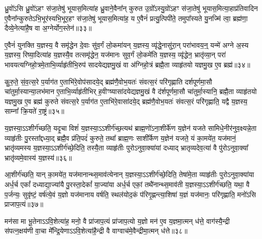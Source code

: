 {\anuvakamend[{उ॒क्थ्ये॑नोपा॒प्नोत्य॑गच्छतां॒ यः पु॑रो॒डाशं॑ च चत्वारि॒ꣳ॒शच्च॑॥९॥}]}

ध्रु॒वो॑\-ऽसि ध्रु॒वो॑\-ऽहꣳ स॑जा॒तेषु॑ भूयास॒मित्या॑ह ध्रु॒वाने॒वैना᳚न् कुरुत उ॒ग्रो᳚\-ऽस्यु॒ग्रो॑\-ऽहꣳ स॑जा॒तेषु॑ भूयास॒मित्या॒हाप्र॑तिवादिन ए॒वैना᳚न्कुरुते\-ऽभि॒भूर॑स्यभि॒भूर॒हꣳ स॑जा॒तेषु॑ भूयास॒मित्या॑ह॒ य ए॒वैनं॑ प्रत्यु॒त्पिपी॑ते॒ तमुपा᳚स्यते यु॒नज्मि॑ त्वा॒ ब्रह्म॑णा॒ दैव्ये॒नेत्या॑है॒ष वा अ॒ग्नेर्योग॒स्तेन॑॥३३॥

ए॒वैनं॑ युनक्ति य॒ज्ञस्य॒ वै समृ॑द्धेन दे॒वाः सु॑व॒र्गं लो॒कमा॑यन् य॒ज्ञस्य॒ व्यृ॑द्धे॒नासु॑रा॒न् परा॑भावय॒न्॒ यन्मे॑ अग्ने अ॒स्य य॒ज्ञस्य॒ रिष्या॒दित्या॑ह य॒ज्ञस्यै॒व तत्समृ॑द्धेन॒ यज॑मानः सुव॒र्गं लो॒कमे॑ति य॒ज्ञस्य॒ व्यृ॑द्धेन॒ भ्रातृ॑व्या॒न् परा॑ भावयत्यग्निहो॒त्रमे॒ताभि॒र्व्याहृ॑तीभि॒रुप॑ सादयेद्यज्ञमु॒खं वा अ॑ग्निहो॒त्रं ब्रह्मै॒ता व्याहृ॑तयो यज्ञमु॒ख ए॒व ब्रह्म॑॥३४॥

कु॒रु॒ते॒ सं॒व॒त्स॒रे प॒र्याग॑त ए॒ताभि॑रे॒वोप॑सादये॒द् ब्रह्म॑णै॒वोभ॒यतः॑ संवत्स॒रं परि॑गृह्णाति दर्\mbox{}शपूर्णमा॒सौ चा॑तुर्मा॒स्यान्या॒लभ॑मान ए॒ताभि॒र्व्याहृ॑तीभिर्\mbox{} ह॒वीꣳष्यासा॑दयेद्यज्ञमु॒खं वै द॑र्\mbox{}शपूर्णमा॒सौ चा॑तुर्मा॒स्यानि॒ ब्रह्मै॒ता व्याहृ॑तयो यज्ञमु॒ख ए॒व ब्रह्म॑ कुरुते संवत्स॒रे प॒र्याग॑त ए॒ताभि॑रे॒वासा॑दये॒द् ब्रह्म॑णै॒वोभ॒यतः॑ संवत्स॒रं परि॑गृह्णाति॒ यद्वै य॒ज्ञस्य॒ साम्ना᳚ क्रि॒यते॑ रा॒ष्ट्रं॥३५॥

य॒ज्ञस्या॒\-ऽ\-ऽशीर्ग॑च्छति॒ यदृ॒चा विशं॑ य॒ज्ञस्या॒\-ऽ\-ऽशीर्ग॑च्छ॒त्यथ॑ ब्राह्म॒णो॑\-ऽना॒शीर्के॑ण य॒ज्ञेन॑ यजते सामिधे॒नीर॑नुव॒क्ष्यन्ने॒ता व्याहृ॑तीः पु॒रस्ता᳚द्दध्या॒द् ब्रह्मै॒व प्र॑ति॒पदं॑ कुरुते॒ तथा᳚ ब्राह्म॒णः साशी᳚र्केण य॒ज्ञेन॑ यजते॒ यं का॒मये॑त॒ यज॑मानं॒ भ्रातृ॑व्यमस्य य॒ज्ञस्या॒\-ऽ\-ऽशीर्ग॑च्छे॒दिति॒ तस्यै॒ता व्याहृ॑तीः पुरो\-ऽनुवा॒क्या॑यां दध्याद् भ्रातृव्यदेव॒त्या॑ वै पु॑रो\-ऽनुवा॒क्या᳚ भ्रातृ॑व्यमे॒वास्य॑ य॒ज्ञस्य॑॥३६॥

आ॒शीर्ग॑च्छति॒ यान् का॒मये॑त॒ यज॑मानान्थ्स॒माव॑त्येनान् य॒ज्ञस्या॒\-ऽ\-ऽशीर्ग॑च्छे॒दिति॒ तेषा॑मे॒ता व्याहृ॑तीः पुरो\-ऽनुवा॒क्या॑या अर्ध॒र्च एकां᳚ दध्याद्या॒ज्या॑यै पु॒रस्ता॒देकां᳚ या॒ज्या॑या अर्ध॒र्च एकां॒ तथै॑नान्थ्स॒माव॑ती य॒ज्ञस्या॒\-ऽ\-ऽशीर्ग॑च्छति॒ यथा॒ वै प॒र्जन्यः॒ सुवृ॑ष्टं॒ वर्\mbox{}ष॑त्ये॒वं य॒ज्ञो यज॑मानाय वर्\mbox{}षति॒ स्थल॑योद॒कं प॑रिगृ॒ह्णन्त्या॒शिषा॑ य॒ज्ञं यज॑मानः॒ परि॑गृह्णाति॒ मनो॑\-ऽसि प्राजाप॒त्यं॥३७॥

मन॑सा मा भू॒तेना\-ऽ\-ऽवि॒शेत्या॑ह॒ मनो॒ वै प्रा॑जाप॒त्यं प्रा॑जाप॒त्यो य॒ज्ञो मन॑ ए॒व य॒ज्ञमा॒त्मन् ध॑त्ते॒ वाग॑स्यै॒न्द्री स॑पत्न॒क्षय॑णी वा॒चा मे᳚न्द्रि॒येणा\-ऽ\-ऽवि॒शेत्या॑है॒न्द्री वै वाग्वाच॑मे॒वैन्द्रीमा॒त्मन् ध॑त्ते॥३८॥

